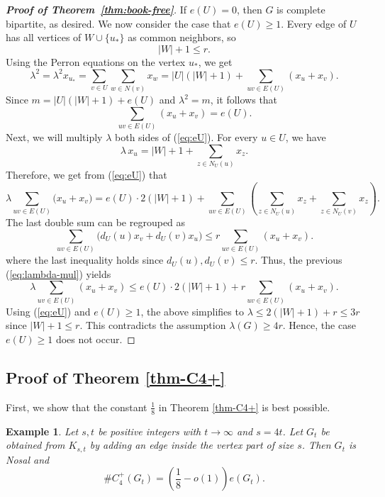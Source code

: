 \documentclass[10pt,a4paper]{amsart}
\newtheorem{example}[theorem]{Example}
\renewcommand{\le}{\leqslant}
\renewcommand{\ge}{\geqslant}
\begin{document}
\begin{proof}[{\bf Proof of Theorem~\ref{thm:book-free}}]
If $e(U)=0$, then $G$ is complete bipartite, as desired. We now consider the case that $e(U)\ge 1$.  Every edge of $U$ has all vertices of $W\cup\{u_*\}$ as common neighbors, so
\[
|W| +1 \le r.
\]  
Using the Perron equations on the vertex $u_*$, we get
\[ \lambda^2= 
\lambda^2 x_{u_*}=\sum_{v\in U} \sum_{w\in N(v)} x_w 
=|U| (|W| +1)+ \sum_{uv\in E(U)} (x_u+x_v).
\]
Since $m=|U| (|W| +1)+ e(U)$ and 
 $\lambda^2=m$, it follows that
\begin{equation} \label{eq:eU}
\sum_{uv\in E(U)} (x_u+x_v)=e(U).
\end{equation}
Next, we will multiply $\lambda$ both sides of (\ref{eq:eU}). 
For every $u\in U$, we have
\[
\lambda \, x_u=|W| +1 +\sum_{z\in N_U(u)}x_z.
\]
Therefore, we get from (\ref{eq:eU}) that 
\begin{equation} \label{eq:lambda-mul} 
 \lambda \sum_{uv\in E(U)}\bigl( x_u+ x_v\bigr) 
=
e(U) \cdot 2(|W| +1)+
\sum_{uv\in E(U)}\left(\sum_{z\in N_U(u)}x_z+
\sum_{z\in N_U(v)}x_z\right).
\end{equation}
The last double sum can be regrouped as
\[
\sum_{uv\in E(U)}\bigl(d_U(u)x_v+d_U(v)x_u\bigr) \le r\sum_{uv\in E(U)}(x_u+x_v).
\]
where the last inequality holds since $d_U(u), d_U(v)\le r$. 
Thus, the previous (\ref{eq:lambda-mul}) yields 
\[
\lambda \sum_{uv\in E(U)}(x_u+x_v) \le e(U)\cdot 2(|W| +1)+r \sum_{uv\in E(U)}(x_u+x_v).
\]
Using (\ref{eq:eU}) and $e(U)\ge 1$, the above   simplifies to 
$\lambda \le 2(|W| +1) +r \le 3r$ since $|W|+1\le r$. 
This contradicts the assumption $\lambda(G)\ge 4r$. Hence, the case $e(U)\ge 1$ does not occur. 
\end{proof}


\subsection{Proof of Theorem \ref{thm-C4+}}

\label{sec:kites}

First, we show that the constant $\frac{1}{8}$ in Theorem \ref{thm-C4+} is best possible.

\begin{example} \label{exam-sharp-constant}
Let $s,t$ be positive integers with $t\to \infty$ and $s=4t$.
Let $G_t$ be obtained from $K_{s,t}$ by adding an edge inside   
the vertex part of size $s$. Then 
$G_t$ is Nosal and 
$$\texttt{\#}  C_4^+(G_t)= 
\left(\frac{1}{8}- o(1) \right)e(G_t). $$
\end{example} 
\end{document}
